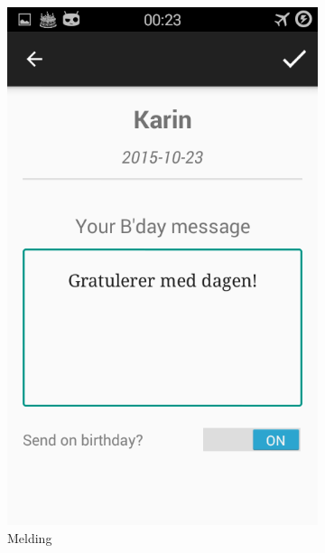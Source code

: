 \begin{figure}[ht]
\begin{subfigure}[b]{0.35\textwidth}
        \includegraphics[width=\textwidth]{./img/3.png}
        \caption{Melding}
        \label{fig:melding}
    \end{subfigure}
    \begin{subfigure}[b]{0.35\textwidth}

\end{subfigure}
\end{figure}
